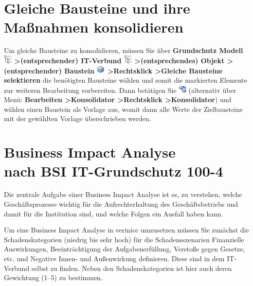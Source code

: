 \documentclass[a4paper,10pt]{book}
\begin{document}
\section{Gleiche Bausteine und ihre Maßnahmen konsolidieren}
Um gleiche Bausteine zu konsolidieren, müssen Sie über \textbf{Grundschutz Modell \includegraphics[height=2ex]{Icon/GS_Modell.png} \textgreater (entsprechender) IT-Verbund \includegraphics[height=2ex]{Icon/GS_Modell.png} \textgreater (entsprechendes) Objekt \textgreater (entsprechender) Baustein \includegraphics[height=2ex]{Icon/Baustein.png} \textgreater Rechtsklick \textgreater Gleiche Bausteine selektieren} die benötigten Bausteine wählen und somit die markierten Elemente zur weiteren Bearbeitung vorbereiten. Dann betätigen Sie \includegraphics[height=2ex]{Icon/Konsolidator.png} (alternativ über Menü: \textbf{Bearbeiten \textgreater Konsolidator \textgreater Rechtsklick \textgreater Konsolidator}) und wählen einen Baustein als Vorlage aus, womit dann alle Werte der Zielbausteine mit der gewählten Vorlage überschrieben werden.


\section{Business Impact Analyse\\ nach BSI IT-Grund\-schutz 100-4}
\label{sec:business-impact-analyse-nach-bsi-it-grundschutz-100-4}

Die zentrale Aufgabe einer Business Impact Analyse ist es, zu verstehen, welche
Geschäftsprozesse wichtig für die Aufrechterhaltung des Geschäftsbetriebs und
damit für die Institution sind, und welche Folgen ein Ausfall haben kann.

Um eine Business Impact Analyse in verinice umzusetzen müssen Sie zunächst die
Schadenskategorien (niedrig bis sehr hoch) für die Schadensszenarien Finanzielle
Auswirkungen, Beeinträchtigung der Aufgabenerfüllung, Verstoße gegen Gesetze,
etc. und Negative Innen- und Außenwirkung definieren. Diese sind in dem
IT-Verbund selbst zu finden. Neben den Schadenskategorien ist hier auch
deren Gewichtung (1--5) zu bestimmen.
\end{document}
